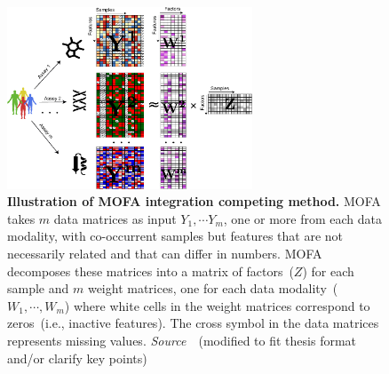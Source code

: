 \begin{description}
\begin{figure}[!h]
  	\centering
  	\includegraphics[width=0.65\textwidth]{Alg_MOFA/fig}
  	\vspace{0.1cm}
  	\caption[Illustration of MOFA integration competing method.]{\textbf{Illustration of MOFA integration competing method.} MOFA takes $m$ data matrices as input $Y_1, \cdots Y_m$, one or more from each data modality, with co-occurrent samples but features that are not necessarily related and that can differ in numbers. MOFA decomposes these matrices into a matrix of factors~($Z$) for each sample and $m$ weight matrices, one for each data modality~($W_1,\cdots, W_m$) where white cells in the weight matrices correspond to zeros~(i.e., inactive features). The cross symbol in the data matrices represents missing values. \emph{Source~\cite{tewari2017mofa}}~(modified to fit thesis format and/or clarify key points)
  }
  	\label{fig:Alg_MOFA}
\end{figure}
 

\end{description}
